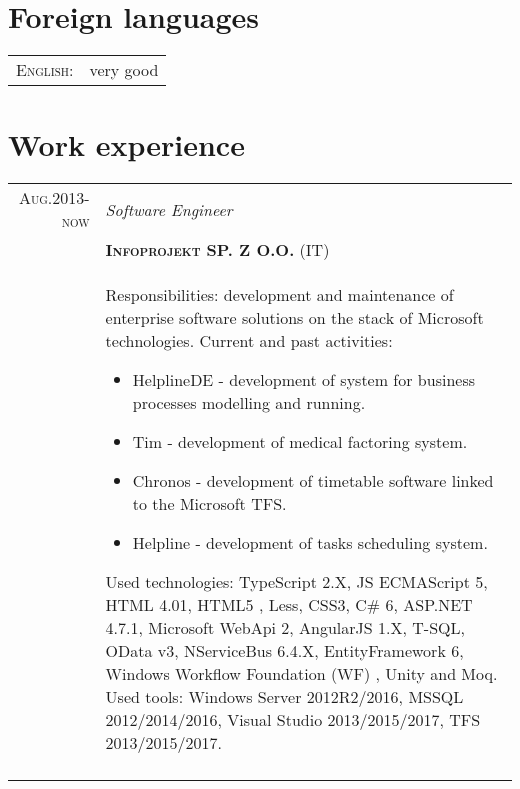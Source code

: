 \documentclass[a4paper,12pt]{article}
\begin{document}
\section{Foreign languages}
\begin{tabular}{r|p{11cm}}
	\textsc{English:}&very good\\
\end{tabular}

\section{Work experience}
\begin{tabular}{r|p{12cm}}
\textsc{Aug.2013-now}
	&\emph{Software Engineer} \\
	&\textsc{\textbf{Infoprojekt SP. Z O.O.}} (IT) \\
	&\footnotesize{
		Responsibilities: development and maintenance of enterprise software solutions on the stack of Microsoft technologies. \newline
		Current and past activities:
		\begin{itemize}
			\item HelplineDE - development of system for business processes modelling and running.
		        \item Tim -  development of medical factoring system.
		        \item Chronos - development of timetable software linked to the Microsoft TFS.
			\item Helpline - development of tasks scheduling system.
		\end{itemize}
		Used technologies: \newline
		TypeScript 2.X, JS ECMAScript 5, HTML 4.01, HTML5 , Less, CSS3, C\# 6, ASP.NET 4.7.1, Microsoft WebApi 2, AngularJS 1.X, T-SQL,
		OData v3, NServiceBus 6.4.X, EntityFramework 6, Windows Workflow Foundation (WF) , Unity and Moq. \newline
		Used tools: \newline
		Windows Server 2012R2/2016, MSSQL 2012/2014/2016, Visual Studio 2013/2015/2017, TFS 2013/2015/2017.
	}\\
	\multicolumn{2}{c}{}\\

\end{tabular}
\end{document}
